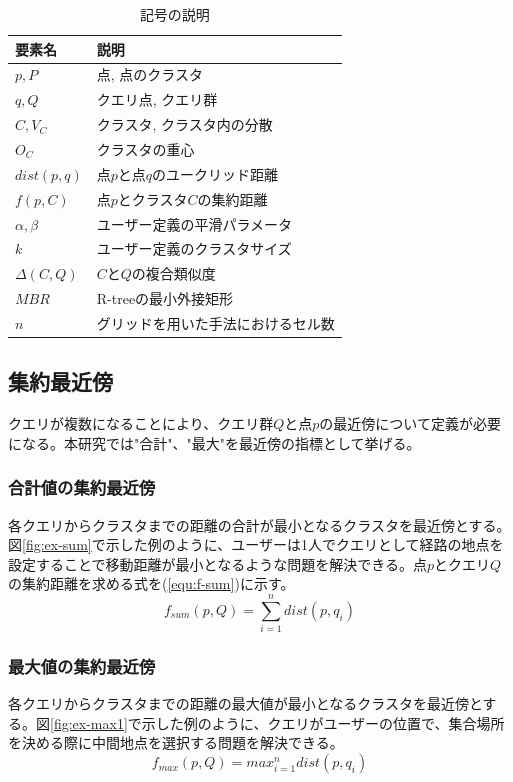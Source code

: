 \documentclass{deimj}
\theoremstyle{definition}
\begin{document}
\begin{table}[htb]
  \begin{center}
    \begin{tabular}{|l|l|} \hline
      要素名 & 説明 \\ \hline \hline
      $p, P$ & 点, 点のクラスタ \\ \hline
      $q, Q$ & クエリ点, クエリ群 \\ \hline
      $C, V_C$ & クラスタ, クラスタ内の分散 \\ \hline
      $O_C$ & クラスタの重心 \\ \hline
      $dist(p,q)$ & 点$p$と点$q$のユークリッド距離 \\ \hline
      $f(p, C)$  & 点$p$とクラスタ$C$の集約距離 \\ \hline
      $\alpha, \beta$ & ユーザー定義の平滑パラメータ \\ \hline
      $k$ & ユーザー定義のクラスタサイズ \\ \hline
      $\Delta(C,Q)$ & $C$と$Q$の複合類似度 \\ \hline
      $MBR$ & R-treeの最小外接矩形 \\ \hline
      $n$ & グリッドを用いた手法におけるセル数 \\ \hline
    \end{tabular}
    \caption{記号の説明}
    \label{tab:var}
  \end{center}
\end{table}

\subsection{集約最近傍}
クエリが複数になることにより、クエリ群$Q$と点$p$の最近傍について定義が必要になる。本研究では"合計"、"最大"を最近傍の指標として挙げる。
\subsubsection{合計値の集約最近傍}
各クエリからクラスタまでの距離の合計が最小となるクラスタを最近傍とする。図\ref{fig:ex-sum}で示した例のように、ユーザーは1人でクエリとして経路の地点を設定することで移動距離が最小となるような問題を解決できる。点$p$とクエリ$Q$の集約距離を求める式を(\ref{equ:f-sum})に示す。
\begin{equation}
\label{equ:f-sum}
f_{sum}(p,Q) = \sum_{i=1}^{n} dist(p,q_i)
\end{equation}

\subsubsection{最大値の集約最近傍}
各クエリからクラスタまでの距離の最大値が最小となるクラスタを最近傍とする。図\ref{fig:ex-max1}で示した例のように、クエリがユーザーの位置で、集合場所を決める際に中間地点を選択する問題を解決できる。
\begin{equation}
\label{equ:f-max}
f_{max}(p,Q) = max_{i=1}^{n} dist(p,q_i)
\end{equation}
\end{document}
